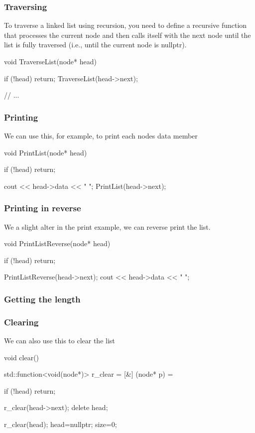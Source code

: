 \documentclass{report}
\begin{document}
\subsubsection{Traversing}
\bigbreak \noindent 
To traverse a linked list using recursion, you need to define a recursive function that processes the current node and then calls itself with the next node until the list is fully traversed (i.e., until the current node is nullptr).
\bigbreak \noindent 
\begin{cppcode}
    void TraverseList(node* head) {
        if (!head) {
            return;
        }
        TraverseList(head->next);

        // ...
    }
\end{cppcode}
\bigbreak \noindent 
\subsubsection{Printing}
\bigbreak \noindent \bigbreak \noindent 
We can use this, for example, to print each nodes data member
\bigbreak \noindent 
\begin{cppcode}
    void PrintList(node* head) {
        if (!head) return;

        cout << head->data << " ";
        PrintList(head->next);
    }
\end{cppcode}

\bigbreak \noindent 
\subsubsection{Printing in reverse}
\bigbreak \noindent \bigbreak \noindent 
We a slight alter in the print example, we can reverse print the list. 
\bigbreak \noindent 
\begin{cppcode}
    void PrintListReverse(node* head) {
        if (!head) return;

        PrintListReverse(head->next);
        cout << head->data << " ";
    }
\end{cppcode}

\bigbreak \noindent 
\subsubsection{Getting the length}
\bigbreak \noindent 


\bigbreak \noindent 
\subsubsection{Clearing}
\bigbreak \noindent \bigbreak \noindent 
We can also use this to clear the list
\bigbreak \noindent 
\begin{cppcode}
    void clear() {
        std::function<void(node*)> r_clear = [&] (node* p) = {
            if (!head) return;

            r_clear(head->next);
            delete head;
        } 
        r_clear(head);
        head=nullptr;
        size=0;
    }
\end{cppcode}
\end{document}
